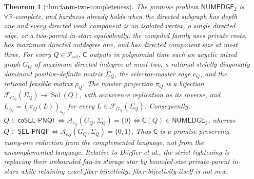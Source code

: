 \documentclass{article}
\newtheorem{theorem}{Theorem}
\begin{document}
\begin{theorem}[thm:fanin-two-completeness]\label{thm:fanin-two-completeness}
The promise problem \(\mathsf{NUMEDGE}_2\) is \(\forall\mathbb R\)-complete, and hardness already holds when the directed subgraph has depth one and every directed weak component is an isolated vertex, a single directed edge, or a two-parent in-star; equivalently, the compiled family uses private roots, has maximum directed outdegree one, and has directed component size at most three.  For every \(Q\in\mathcal P_{\mathrm{sel}}\), \(\mathsf C\) outputs in polynomial time such an acyclic mixed graph \(G_Q\) of maximum directed indegree at most two, a rational strictly diagonally dominant positive-definite matrix \(\Sigma_Q\), the selector-master edge \(e_Q\), and the rational feasible matrix \(\rho_Q\).  The master projection \(\pi_Q\) is a bijection \(\mathcal F_{G_Q}(\Sigma_Q)\to\operatorname{Sol}(Q)\), with occurrence replication as its inverse, and \(L_{e_Q}=(\pi_Q(L))_{s_Q}\) for every \(L\in\mathcal F_{G_Q}(\Sigma_Q)\).  Consequently, \(Q\in\mathsf{coSEL\mbox{-}PNQF}\Longleftrightarrow\mathcal A_{e_Q}(G_Q,\Sigma_Q)=\{0\}\Longleftrightarrow\mathsf C(Q)\in\mathsf{NUMEDGE}_2\), whereas \(Q\in\mathsf{SEL\mbox{-}PNQF}\Longleftrightarrow\mathcal A_{e_Q}(G_Q,\Sigma_Q)=\{0,1\}\).  Thus \(\mathsf C\) is a promise-preserving many-one reduction from the complemented language, not from the uncomplemented language.  Relative to Dörfler et al., the strict tightening is replacing their unbounded-fan-in storage star by bounded-size private-parent in-stars while retaining exact fiber bijectivity; fiber bijectivity itself is not new.
\end{theorem}
\end{document}

